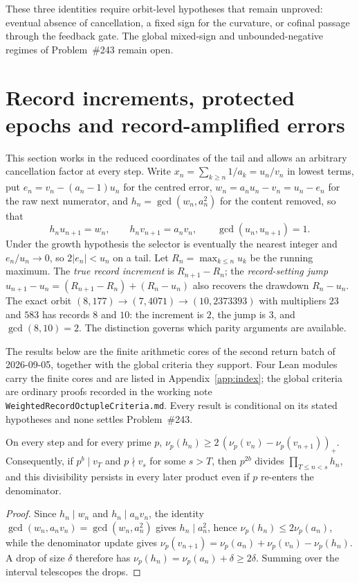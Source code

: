 \documentclass[11pt]{article}
\begin{document}
These three identities require orbit-level hypotheses that remain unproved:
eventual absence of cancellation, a fixed sign for the curvature, or cofinal
passage through the feedback gate.  The global mixed-sign and
unbounded-negative regimes of Problem~\#243 remain open.


\section{Record increments, protected epochs and record-amplified errors}\label{sec:records}

This section works in the reduced coordinates of the tail and allows an
arbitrary cancellation factor at every step.  Write
$x_n=\sum_{k\ge n}1/a_k=u_n/v_n$ in lowest terms, put
$e_n=v_n-(a_n-1)u_n$ for the centred error, $w_n=a_nu_n-v_n=u_n-e_n$ for the
raw next numerator, and $h_n=\gcd(w_n,a_n^2)$ for the content removed, so that
\[
 h_nu_{n+1}=w_n,\qquad h_nv_{n+1}=a_nv_n,\qquad \gcd(u_n,u_{n+1})=1 .
\]
Under the growth hypothesis the selector is eventually the nearest integer and
$e_n/u_n\to0$, so $2|e_n|<u_n$ on a tail.  Let $R_n=\max_{k\le n}u_k$ be the
running maximum.  The \emph{true record increment} is $R_{n+1}-R_n$; the
\emph{record-setting jump} $u_{n+1}-u_n=(R_{n+1}-R_n)+(R_n-u_n)$ also recovers
the drawdown $R_n-u_n$.  The exact orbit
$(8,177)\to(7,4071)\to(10,2373393)$ with multipliers $23$ and $583$ has
records $8$ and $10$: the increment is $2$, the jump is $3$, and
$\gcd(8,10)=2$.  The distinction governs which parity arguments are available.

The results below are the finite arithmetic cores of the second return batch of
2026-09-05, together with the global criteria they support.  Four Lean modules
carry the finite cores and are listed in Appendix~\ref{app:index}; the global
criteria are ordinary proofs recorded in the working note
\texttt{WeightedRecordOctupleCriteria.md}.  Every result is conditional on its
stated hypotheses and none settles Problem~\#243.

\begin{theorem}\label{res:squarepayment}
On every step and for every prime $p$,
$\nu_p(h_n)\ge2\,(\nu_p(v_n)-\nu_p(v_{n+1}))_+$.  Consequently, if $p^b\mid v_T$
and $p\nmid v_s$ for some $s>T$, then $p^{2b}$ divides $\prod_{T\le n<s}h_n$, and
this divisibility persists in every later product even if $p$ re-enters the
denominator.
\end{theorem}

\begin{proof}
Since $h_n\mid w_n$ and $h_n\mid a_nv_n$, the identity
$\gcd(w_n,a_nv_n)=\gcd(w_n,a_n^2)$ gives $h_n\mid a_n^2$, hence
$\nu_p(h_n)\le2\nu_p(a_n)$, while the denominator update gives
$\nu_p(v_{n+1})=\nu_p(a_n)+\nu_p(v_n)-\nu_p(h_n)$.  A drop of size $\delta$
therefore has $\nu_p(h_n)=\nu_p(a_n)+\delta\ge2\delta$.  Summing over the
interval telescopes the drops.
\end{proof}
\end{document}
